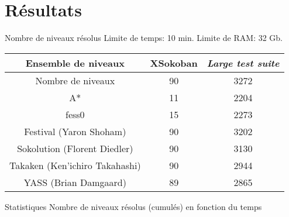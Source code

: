     \section{Résultats}
        \begin{frame}{Nombre de niveaux résolus}
            Limite de temps: 10 min. Limite de RAM: 32 Gb.
            \centering
            \begin{tabular}{|c|c|c|}
                \hline
                Ensemble de niveaux            & XSokoban & \textit{Large test suite} \\
                \hline
                Nombre de niveaux              & 90       & 3272 \\
                \hline
                A*                             & 11       & 2204 \\
                \hline
                fess0                          & 15       & 2273 \\
                \hline
                Festival (Yaron Shoham)        & 90       & 3202 \\
                \hline
                Sokolution (Florent Diedler)   & 90       & 3130 \\
                \hline
                Takaken (Ken'ichiro Takahashi) & 90       & 2944 \\
                \hline
                YASS (Brian Damgaard)          & 89       & 2865 \\
                \hline
            \end{tabular}
        \end{frame}

        \begin{frame}{Statistiques}
            \centering
            Nombre de niveaux résolus (cumulés) en fonction du temps

            \vspace{0.4cm}
            
        \end{frame}

